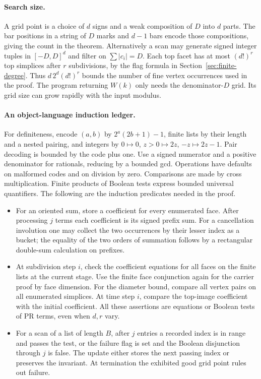 \paragraph{Search size.}
A grid point is a choice of $d$ signs and a weak composition of $D$
into $d$ parts. The bar positions in a string of $D$ marks and $d-1$
bars encode those compositions, giving the count in the theorem.
Alternatively a scan may generate signed integer tuples in $[-D,D]^d$
and filter on $\sum|c_i|=D$. Each top facet has at most $(d!)^r$
top simplices after $r$ subdivisions, by the flag formula in
Section~\ref{sec:finite-degree}. Thus $d\,2^d(d!)^r$ bounds the
number of fine vertex occurrences used in the proof. The program
returning $W(k)$ only needs the denominator-$D$ grid. Its grid size
can grow rapidly with the input modulus.

\paragraph{An object-language induction ledger.}
For definiteness, encode $(a,b)$ by $2^a(2b+1)-1$, finite lists by
their length and a nested pairing, and integers by
$0\mapsto0$, $z>0\mapsto2z$, $-z\mapsto2z-1$. Pair decoding is
bounded by the code plus one. Use a signed numerator and a positive
denominator for rationals, reducing by a bounded gcd. Operations
have defaults on malformed codes and on division by zero.
Comparisons are made by cross multiplication. Finite products of
Boolean tests express bounded universal quantifiers.
The following are the induction predicates needed in the proof.
\begin{itemize}
\item For an oriented sum, store a coefficient for every enumerated face.
After processing $j$ terms each coefficient is its signed prefix sum.
For a cancellation involution one may collect the two occurrences by
their lesser index as a bucket; the equality of the two orders of
summation follows by a rectangular double-sum calculation on prefixes.
\item At subdivision step $i$, check the coefficient equations for all
faces on the finite lists at the current stage. Use the finite face
conjunction again for the carrier proof by face dimension. For the
diameter bound, compare all vertex pairs on all enumerated simplices.
At time step $i$, compare the top-image coefficient with the initial
coefficient. All these assertions are equations or Boolean tests of PR
terms, even when $d,r$ vary.
\item For a scan of a list of length $B$, after $j$ entries a recorded
index is in range and passes the test, or the failure flag is set and
the Boolean disjunction through $j$ is false. The update either stores
the next passing index or preserves the invariant. At termination the
exhibited good grid point rules out failure.
\end{itemize}
